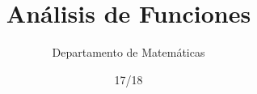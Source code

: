 \documentclass[palatino,nosec]{Docencia}
\title{Análisis de Funciones}
\author{Departamento de Matemáticas}
\date{17/18}
\begin{document}
\begin{itemize}



\end{itemize}
\end{document}
